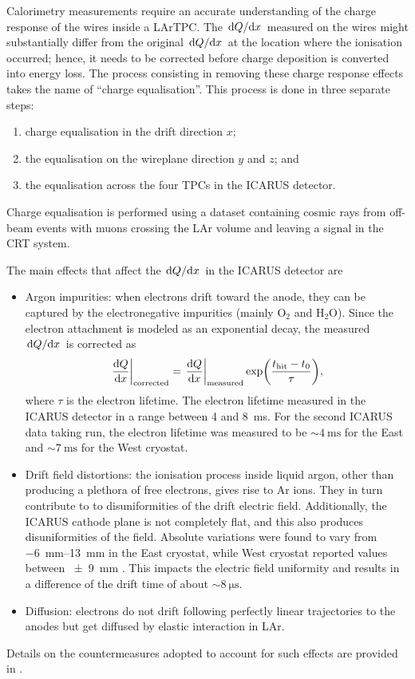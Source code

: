 Calorimetry measurements require an accurate understanding of the charge response of the wires inside a LArTPC. The $\dv*{Q}{x}$ measured on the wires might substantially differ from the original $\dv*{Q}{x}$ at the location where the ionisation occurred; hence, it needs to be corrected before charge deposition is converted into energy loss. The process consisting in removing these charge response effects takes the name of ``charge equalisation''. This process is done in three separate steps: \begin{enumerate}
    \item charge equalisation in the drift direction $x$;
    \item the equalisation on the wireplane direction $y$ and $z$; and 
    \item the equalisation across the four TPCs in the ICARUS detector. 
\end{enumerate} Charge equalisation is performed using a dataset containing cosmic rays from off-beam events with muons crossing the LAr volume and leaving a signal in the CRT system.

The main effects that affect the $\dv*{Q}{x}$ in the ICARUS detector are \begin{itemize}
    \item Argon impurities: when electrons drift toward the anode, they can be captured by the electronegative impurities (mainly $\mathrm{O_2}$ and $\mathrm{H_2O}$). Since the electron attachment is modeled as an exponential decay, the measured $\dv*{Q}{x}$ is corrected as \begin{equation}
        \eval{\dv{Q}{x}}_\mathrm{corrected} = \eval{\dv{Q}{x}}_\mathrm{measured} \exp(\frac{t_\mathrm{hit}-t_0}{\tau}),
    \end{equation} where $\tau$ is the electron lifetime. The electron lifetime measured in the ICARUS detector in a range between 4 and \SI{8}{\ms}. For the second ICARUS data taking run, the electron lifetime was measured to be ${\sim}\SI{4}{\ms}$ for the East and ${\sim}\SI{7}{\ms}$ for the West cryostat. 

    \item Drift field distortions: the ionisation process inside liquid argon, other than producing a plethora of free electrons, gives rise to Ar ions. They in turn contribute to to disuniformities of the drift electric field. Additionally, the ICARUS cathode plane is not completely flat, and this also produces disuniformities of the field. Absolute variations were found to vary from \qtyrange{-6}{13}{\mm} in the East cryostat, while West cryostat reported values between \SI{+-9}{\mm} \cite{arteroponsStudyReconstructionNuMuCC}. This impacts the electric field uniformity and results in a difference of the drift time of about ${\sim}\SI{8}{\us}$. 

    \item Diffusion: electrons do not drift following perfectly linear trajectories to the anodes but get diffused by elastic interaction in LAr. 
\end{itemize} Details on the countermeasures adopted to account for such effects are provided in \cite{arteroponsStudyReconstructionNuMuCC}. 

